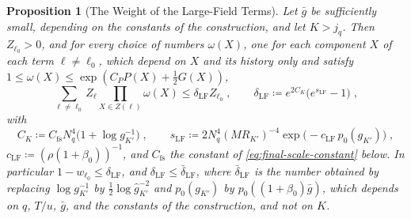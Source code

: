 \documentclass[11pt]{preprint}
\numberwithin{equation}{section}
\newtheorem{proposition}[theorem]{Proposition}
\theoremstyle{definition}
\theoremstyle{remark}
\theoremstyle{plain}
\begin{document}
\begin{proposition}[The Weight of the Large-Field Terms]\label{prop:large-field-weight}
Let $\bar g$ be sufficiently small, depending on the constants of the construction, and let $K > j_q$. Then $Z_{\ell_0} > 0$, and for every choice of numbers $\omega(X)$, one for each component $X$ of each term $\ell \neq \ell_0$, which depend on $X$ and its history only and satisfy $1 \leq \omega(X) \leq \exp(C_PP(X) + \frac12G(X))$,
\begin{equation}\label{eq:large-field-weight}
    \sum_{\ell \neq \ell_0}Z_\ell\prod_{X \in Z(\ell)}\omega(X) \leq \delta_{\mathrm{LF}}Z_{\ell_0}\;,
    \qquad
    \delta_{\mathrm{LF}} \coloneqq e^{2C_K}\bigl(e^{s_{\mathrm{LF}}} - 1\bigr)\;,
\end{equation}
with
\begin{equation}\label{eq:large-field-constants}
    C_K \coloneqq C_{\mathrm{fs}}N_q^4\bigl(1 + \log g_{K'}^{-1}\bigr)\;,
    \qquad
    s_{\mathrm{LF}} \coloneqq 2N_q^4(MR_{K'})^{-4}\exp\bigl(-c_{\mathrm{LF}}\,p_0(g_{K'})\bigr)\;,
\end{equation}
$c_{\mathrm{LF}} \coloneqq (\rho(1 + \beta_0))^{-1}$, and $C_{\mathrm{fs}}$ the constant of \eqref{eq:final-scale-constant} below. In particular $1 - w_{\ell_0} \leq \delta_{\mathrm{LF}}$, and $\delta_{\mathrm{LF}} \leq \bar\delta_{\mathrm{LF}}$, where $\bar\delta_{\mathrm{LF}}$ is the number obtained by replacing $\log g_{K'}^{-1}$ by $\frac12\log\hat g_{K'}^{-2}$ and $p_0(g_{K'})$ by $p_0((1 + \beta_0)\bar g)$, which depends on $q$, $T/u$, $\bar g$, and the constants of the construction, and not on $K$.
\end{proposition}
\end{document}
